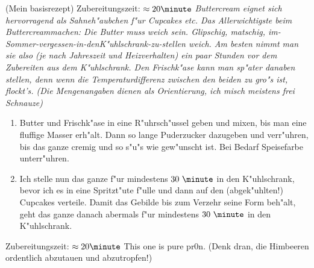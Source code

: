 (Mein basisrezept) \hfill Zubereitungszeit: $\approx20 \minute$
\textit{Buttercream eignet sich hervorragend als Sahneh"aubchen f"ur Cupcakes etc.
Das Allerwichtigste beim Buttercreammachen: Die Butter muss weich sein. Glipschig, matschig, im-Sommer-vergessen-in-denK"uhlschrank-zu-stellen weich.
Am besten nimmt man sie also (je nach Jahreszeit und Heizverhalten) ein paar Stunden vor dem Zubereiten
aus dem K"uhlschrank. Den Frischk"ase kann man sp"ater danaben stellen, denn wenn die Temperaturdifferenz zwischen den beiden zu gro"s ist, flockt's.
(Die Mengenangaben dienen als Orientierung, ich misch meistens frei Schnauze)}

\begin{enumerate}
\item	Butter und Frischk"ase in eine R"uhrsch"ussel geben und mixen, bis man eine fluffige Masser erh"alt.
      Dann so lange Puderzucker dazugeben und verr"uhren, bis das ganze cremig und so s"u"s wie gew"unscht ist.
      Bei Bedarf Speisefarbe unterr"uhren.
\item	Ich stelle nun das ganze f"ur mindestens $30~\minute$ in den K"uhlschrank, bevor ich es in eine Spritzt"ute f"ulle
      und dann auf den (abgek"uhlten!) Cupcakes verteile. Damit das Gebilde bis zum Verzehr seine Form beh"alt,
      geht das ganze danach abermals f"ur mindestens $30~\minute$ in den K"uhlschrank.
\end{enumerate}

\hfill Zubereitungszeit: $\approx20 \minute$
This one is pure pr0n. (Denk dran, die Himbeeren ordentlich abzutauen und abzutropfen!)

